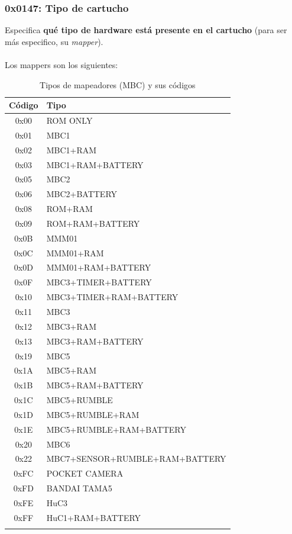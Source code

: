 \subsubsection{0x0147: Tipo de cartucho}
Especifica \textbf{qué tipo de hardware está presente en el cartucho} (para ser más especifico, su \textit{mapper}).
\\\\
Los mappers son los siguientes:
\begin{longtable}{|c|l|}
\hline
\textbf{Código} & \textbf{Tipo} \\
\hline
0x00 & ROM ONLY \\ \hline
0x01 & MBC1 \\ \hline
0x02 & MBC1+RAM \\ \hline
0x03 & MBC1+RAM+BATTERY \\ \hline
0x05 & MBC2 \\ \hline
0x06 & MBC2+BATTERY \\ \hline
0x08 & ROM+RAM \\ \hline
0x09 & ROM+RAM+BATTERY \\ \hline
0x0B & MMM01 \\ \hline
0x0C & MMM01+RAM \\ \hline
0x0D & MMM01+RAM+BATTERY \\ \hline
0x0F & MBC3+TIMER+BATTERY \\ \hline
0x10 & MBC3+TIMER+RAM+BATTERY \\ \hline
0x11 & MBC3 \\ \hline
0x12 & MBC3+RAM \\ \hline
0x13 & MBC3+RAM+BATTERY \\ \hline
0x19 & MBC5 \\ \hline
0x1A & MBC5+RAM \\ \hline
0x1B & MBC5+RAM+BATTERY \\ \hline
0x1C & MBC5+RUMBLE \\ \hline
0x1D & MBC5+RUMBLE+RAM \\ \hline
0x1E & MBC5+RUMBLE+RAM+BATTERY \\ \hline
0x20 & MBC6 \\ \hline
0x22 & MBC7+SENSOR+RUMBLE+RAM+BATTERY \\ \hline
0xFC & POCKET CAMERA \\ \hline
0xFD & BANDAI TAMA5 \\ \hline
0xFE & HuC3 \\ \hline
0xFF & HuC1+RAM+BATTERY \\ \hline
\caption{Tipos de mapeadores (MBC) y sus códigos} \\
\end{longtable}

